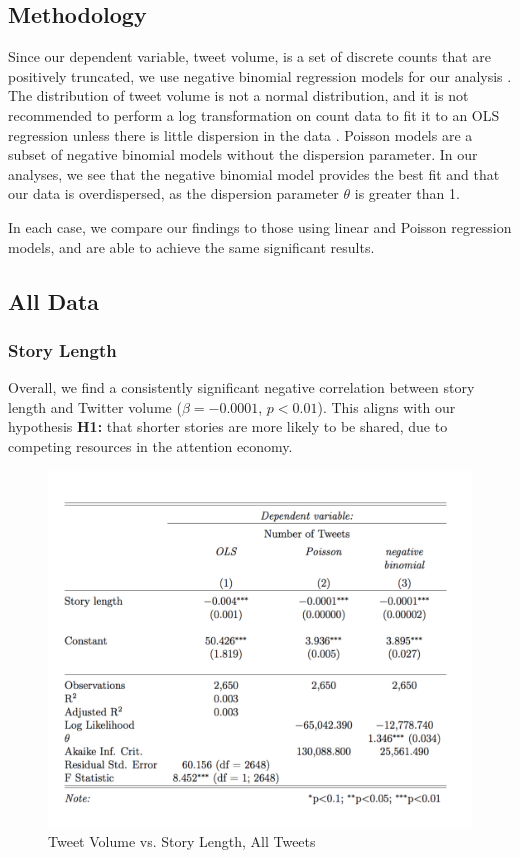 \documentclass[letterpaper]{article}
\begin{document}
\subsection{Methodology}

Since our dependent variable, tweet volume, is a set of discrete counts that are positively truncated, we use negative binomial regression models for our analysis \cite{scott1997regression}. The distribution of tweet volume is not a normal distribution, and it is not recommended to perform a log transformation on count data to fit it to an OLS regression unless there is little dispersion in the data \cite{o2010not}. Poisson models are a subset of negative binomial models without the dispersion parameter. In our analyses, we see that the negative binomial model provides the best fit and that our data is overdispersed, as the dispersion parameter $\theta$ is greater than 1.   

In each case, we compare our findings to those using linear and Poisson regression models, and are able to achieve the same significant results.  

\subsection{All Data}
\subsubsection{Story Length}
Overall, we find a consistently significant negative correlation between story length and Twitter volume ($\beta=-0.0001$, $p<0.01$). 
This aligns with our hypothesis \textbf{H1:} that shorter stories are more likely to be shared, due to competing resources in the attention economy.

\begin{figure}[t!]  
\centering 
  \includegraphics[width=1.0\columnwidth]{story-len-table}  
  \caption{Tweet Volume vs. Story Length, All Tweets
    \label{fig:story-len-table}}
\end{figure}
\end{document}
